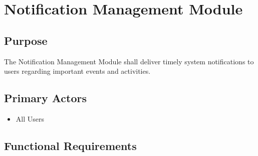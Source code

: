 \section{Notification Management Module}
\label{sec:notifications}

\subsection{Purpose}

The Notification Management Module shall deliver timely system
notifications to users regarding important events and activities.

\subsection{Primary Actors}

\begin{itemize}
\item All Users
\end{itemize}

\subsection{Functional Requirements}


